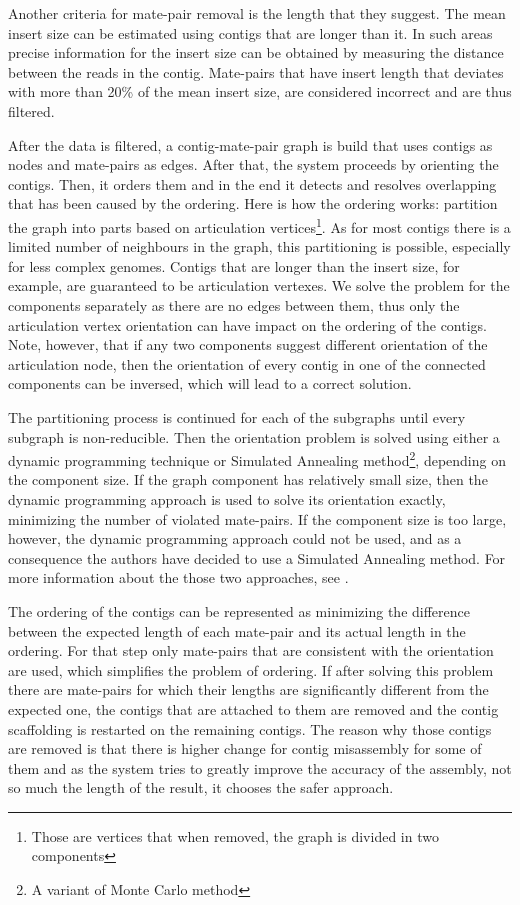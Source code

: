 \documentclass[11pt]{article}
\begin{document}
Another criteria for mate-pair removal is the length that they suggest. The
mean insert size can be estimated using contigs that are longer than it. In such
areas precise information for the insert size can be obtained by measuring the
distance between the reads in the contig. Mate-pairs that have insert length
that deviates with more than 20\% of the mean insert size, are considered
incorrect and are thus filtered.

After the data is filtered, a contig-mate-pair graph is build that uses contigs
as nodes and mate-pairs as edges. After that, the system proceeds by orienting
the contigs. Then, it orders them and in the end it detects and resolves
overlapping that has been caused by the ordering. Here is how the ordering
works: partition the graph into parts based on articulation
vertices\footnote{Those are vertices that when removed, the graph is divided in
two components}. As for most contigs there is a limited number of neighbours in
the graph, this partitioning is possible, especially for less complex genomes.
Contigs that are longer than the insert size, for example, are guaranteed to be
articulation vertexes. We solve the problem for the components separately as
there are no edges between them, thus only the articulation vertex orientation
can have impact on the ordering of the contigs. Note, however, that if any two
components suggest different orientation of the articulation node, then the
orientation of every contig in one of the connected components can be inversed,
which will lead to a correct solution.

The partitioning process is continued for each of the subgraphs until every
subgraph is non-reducible. Then the orientation problem is solved using either a
dynamic programming technique or Simulated Annealing method\footnote{A variant
of Monte Carlo method}, depending on the component size. If the graph component
has relatively small size, then the dynamic programming approach is used to
solve its orientation exactly, minimizing the number of violated mate-pairs. If
the component size is too large, however, the dynamic programming approach could
not be used, and as a consequence the authors have decided to use a Simulated
Annealing method. For more information about the those two approaches, see
\cite{SOPRA}.

The ordering of the contigs can be represented as minimizing the difference
between the expected length of each mate-pair and its actual length in the
ordering. For that step only mate-pairs that are consistent with the orientation
are used, which simplifies the problem of ordering. If after solving this
problem there are mate-pairs for which their lengths are significantly different
from the expected one, the contigs that are attached to them are removed and the
contig scaffolding is restarted on the remaining contigs. The reason why those
contigs are removed is that there is higher change for contig misassembly for
some of them and as the system tries to greatly improve the accuracy of the
assembly, not so much the length of the result, it chooses the safer approach.
\end{document}
